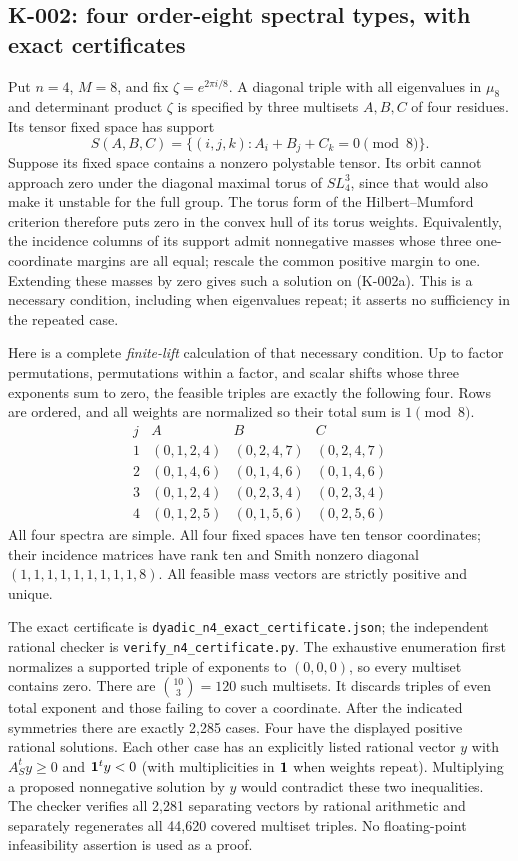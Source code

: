 \subsection{K-002: four order-eight spectral types, with exact certificates}
Put $n=4$, $M=8$, and fix $\zeta=e^{2\pi i/8}$. A diagonal triple
with all eigenvalues in $\mu_8$ and determinant product $\zeta$ is
specified by three multisets $A,B,C$ of four residues. Its tensor
fixed space has support
\[
 S(A,B,C)=\{(i,j,k):A_i+B_j+C_k=0\pmod8\}.                       \tag{K-002a}
\]
Suppose its fixed space contains a nonzero polystable tensor. Its orbit cannot approach zero under the diagonal maximal torus of
$SL_4^3$, since that would also make it unstable for the full group.
The torus form of the Hilbert--Mumford criterion therefore puts zero
in the convex hull of its torus weights. Equivalently, the incidence
columns of its support admit nonnegative masses whose three
one-coordinate margins are all equal; rescale the common positive
margin to one. Extending these masses by zero gives such a solution
on (K-002a). This is a necessary condition, including when
eigenvalues repeat; it asserts no sufficiency in the repeated case.

Here is a complete \emph{finite-lift} calculation of that necessary
condition. Up to factor permutations, permutations within a factor,
and scalar shifts whose three exponents sum to zero, the feasible
triples are exactly the following four. Rows are ordered, and all
weights are normalized so their total sum is $1\pmod8$.
\[
\begin{array}{c|c|c|c}
 j&A&B&C\\\hline
1&(0,1,2,4)&(0,2,4,7)&(0,2,4,7)\\
2&(0,1,4,6)&(0,1,4,6)&(0,1,4,6)\\
3&(0,1,2,4)&(0,2,3,4)&(0,2,3,4)\\
4&(0,1,2,5)&(0,1,5,6)&(0,2,5,6)
\end{array}                                                     \tag{K-002b}
\]
All four spectra are simple. All four fixed spaces have ten tensor
coordinates; their incidence matrices have rank ten and Smith
nonzero diagonal $(1,1,1,1,1,1,1,1,1,8)$. All feasible mass vectors
are strictly positive and unique.

The exact certificate is \texttt{dyadic\_n4\_exact\_certificate.json};
the independent rational checker is
\texttt{verify\_n4\_certificate.py}. The exhaustive enumeration first
normalizes a supported triple of exponents to $(0,0,0)$, so every
multiset contains zero. There are $\binom{10}{3}=120$ such multisets.
It discards triples of even total exponent and those failing to
cover a coordinate. After the indicated symmetries there are exactly
2,285 cases. Four have the displayed positive rational solutions.
Each other case has an explicitly listed rational vector $y$ with
$A_S^ty\ge0$ and ${\bf1}^ty<0$ (with multiplicities in ${\bf1}$ when
weights repeat). Multiplying a proposed nonnegative solution by $y$
would contradict these two inequalities. The checker verifies all
2,281 separating vectors by rational arithmetic and separately
regenerates all 44,620 covered multiset triples. No floating-point
infeasibility assertion is used as a proof.

